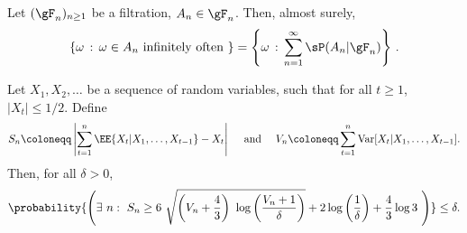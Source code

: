 \begin{lemma}
\label{lem:ebc}
Let $( \gF_n)_{n \ge 1}$ be a filtration, $A_n \in \gF_n$.
Then, almost surely, 
\begin{align}
\{ \omega \,: \, \omega \in A_n \text{ infinitely often } \} = \left\{ \omega \, : \, 
\sum_{n=1}^\infty \sP(A_n|\gF_n) \right\}\,.
\end{align}
\end{lemma}

\begin{lemma}
\label{lem:conc_new}
    Let $X_1, X_2, \dots$ be a sequence of random variables, such that for all $t \ge 1$, $|X_t|\le 1/2 $. Define 
\begin{align}
    S_n \coloneqq \left| \sum_{t=1}^n \EE{ X_t | X_1, \dots, X_{t-1} } - X_t \right|
    \quad \text{ and } \quad 
    V_n \coloneqq \sum_{t=1}^n \mathrm{Var}[ X_t | X_1, \ldots, X_{t-1} ].
\end{align}
Then, for all $\delta> 0$,
\begin{align}
    \probability{ \left( \exists \ n:\ S_n\ge  6 \ \sqrt{  \left(V_n+ \frac{4}{3} \right) \ \log \left( \frac{  V_n+1  }{ \delta } \right) } + 2\log \left( \frac{1}{\delta} \right)  + \frac{4}{3} \log 3
    ~ \right) } \le \delta.
\end{align}
\end{lemma}

